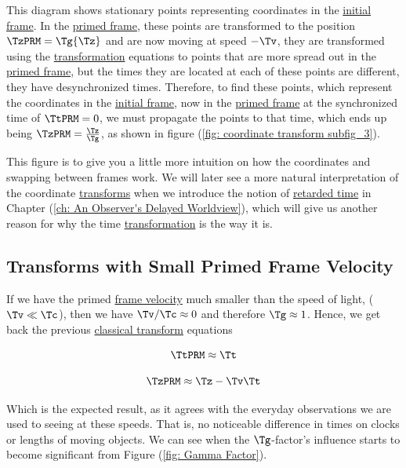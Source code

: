 This diagram shows stationary points representing coordinates in the \hyperlink{def-initial-Frame}{initial frame}.
In the \hyperlink{def-Primed-Frame}{primed frame}, these points are transformed to the position ${\TzPRM  } = \Tg  {\Tz }$ and are now moving at speed $-{\Tv }$, they are transformed using the \hyperlink{def-transform}{transformation} equations to points that are more spread out in the \hyperlink{def-Primed-Frame}{primed frame}, but the times they are located at each of these points are different, they have desynchronized times.
Therefore, to find these points, which represent the coordinates in the \hyperlink{def-initial-Frame}{initial frame}, now in the \hyperlink{def-Primed-Frame}{primed frame} at the synchronized time of $\TtPRM  = 0$, we must propagate the points to that time, which ends up being ${\TzPRM  } = \frac{ {\Tz } }{ \Tg  }$, as shown in figure (\ref{fig: coordinate transform subfig_3}).

This figure is to give you a little more intuition on how the coordinates and swapping between frames work.
We will later see a more natural interpretation of the coordinate \hyperlink{def-transform}{transforms} when we introduce the notion of \hyperlink{def-retarded-time}{retarded time} in Chapter (\ref{ch: An Observer's Delayed Worldview}), which will give us another reason for why the time \hyperlink{def-transform}{transformation} is the way it is.

\subsection{Transforms with Small Primed Frame Velocity} \label{subsect: Transforms with Slow Primed Frame Velocity}

If we have the primed \hyperlink{def-frame-velocity}{frame velocity} much smaller than the speed of light, ($\Tv  \ll \Tc $), then we have ${\Tv }/{\Tc }\approx 0$ and therefore $\Tg  \approx 1$.
Hence, we get back the previous \hyperlink{def-galilean-transform}{classical transform} equations

\begin{equation}
	\TtPRM  \approx \Tt
\end{equation}

\begin{equation}
	\TzPRM  \approx {\Tz }-{\Tv }{\Tt }
\end{equation}

Which is the expected result, as it agrees with the everyday observations we are used to seeing at these speeds.
That is, no noticeable difference in times on clocks or lengths of moving objects.
We can see when the $\Tg $-factor's influence starts to become significant from Figure (\ref{fig: Gamma Factor}).

